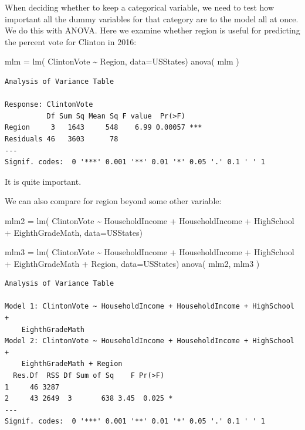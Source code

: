 \documentclass[
  letterpaper,
  DIV=11,
  numbers=noendperiod]{scrreprt}
\newenvironment{Shaded}{\begin{snugshade}}{\end{snugshade}}
\newcommand{\AttributeTok}[1]{\textcolor[rgb]{0.49,0.56,0.16}{#1}}
\newcommand{\FunctionTok}[1]{\textcolor[rgb]{0.02,0.16,0.49}{#1}}
\newcommand{\NormalTok}[1]{\textcolor[rgb]{0.00,0.44,0.13}{#1}}
\newcommand{\OtherTok}[1]{\textcolor[rgb]{0.00,0.44,0.13}{#1}}
\newcommand{\SpecialCharTok}[1]{\textcolor[rgb]{0.25,0.44,0.63}{#1}}
\begin{document}
When deciding whether to keep a categorical variable, we need to test
how important all the dummy variables for that category are to the model
all at once. We do this with ANOVA. Here we examine whether region is
useful for predicting the percent vote for Clinton in 2016:

\begin{Shaded}
\begin{Highlighting}[]
\NormalTok{mlm }\OtherTok{=} \FunctionTok{lm}\NormalTok{( ClintonVote }\SpecialCharTok{\textasciitilde{}}\NormalTok{ Region, }\AttributeTok{data=}\NormalTok{USStates)}
\FunctionTok{anova}\NormalTok{( mlm )}
\end{Highlighting}
\end{Shaded}

\begin{verbatim}
Analysis of Variance Table

Response: ClintonVote
          Df Sum Sq Mean Sq F value  Pr(>F)    
Region     3   1643     548    6.99 0.00057 ***
Residuals 46   3603      78                    
---
Signif. codes:  0 '***' 0.001 '**' 0.01 '*' 0.05 '.' 0.1 ' ' 1
\end{verbatim}

It is quite important.

We can also compare for region beyond some other variable:

\begin{Shaded}
\begin{Highlighting}[]
\NormalTok{mlm2 }\OtherTok{=} \FunctionTok{lm}\NormalTok{( ClintonVote }\SpecialCharTok{\textasciitilde{}}\NormalTok{ HouseholdIncome }\SpecialCharTok{+}\NormalTok{ HouseholdIncome }\SpecialCharTok{+}\NormalTok{ HighSchool }\SpecialCharTok{+} 
\NormalTok{               EighthGradeMath, }\AttributeTok{data=}\NormalTok{USStates)}

\NormalTok{mlm3 }\OtherTok{=} \FunctionTok{lm}\NormalTok{( ClintonVote }\SpecialCharTok{\textasciitilde{}}\NormalTok{ HouseholdIncome }\SpecialCharTok{+}\NormalTok{ HouseholdIncome }\SpecialCharTok{+}\NormalTok{ HighSchool }\SpecialCharTok{+} 
\NormalTok{               EighthGradeMath }\SpecialCharTok{+}\NormalTok{ Region, }\AttributeTok{data=}\NormalTok{USStates)}
\FunctionTok{anova}\NormalTok{( mlm2, mlm3 )}
\end{Highlighting}
\end{Shaded}

\begin{verbatim}
Analysis of Variance Table

Model 1: ClintonVote ~ HouseholdIncome + HouseholdIncome + HighSchool + 
    EighthGradeMath
Model 2: ClintonVote ~ HouseholdIncome + HouseholdIncome + HighSchool + 
    EighthGradeMath + Region
  Res.Df  RSS Df Sum of Sq    F Pr(>F)  
1     46 3287                           
2     43 2649  3       638 3.45  0.025 *
---
Signif. codes:  0 '***' 0.001 '**' 0.01 '*' 0.05 '.' 0.1 ' ' 1
\end{verbatim}
\end{document}
